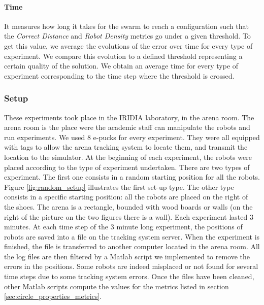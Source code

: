 \documentclass[oneside, a4paper, 12pt]{memoir}
\begin{document}
					
				\paragraph{Time}

				
				It measures how long it takes for the swarm to reach a configuration such that the \emph{Correct Distance} and \emph{Robot Density} metrics go under a given threshold. To get this value, we average the evolutions of the error over time for every type of experiment. We compare this evolution to a defined threshold representing a certain quality of the solution. We obtain an average time for every type of experiment corresponding to the time step where the threshold is crossed.
				
			\subsubsection{Setup}
			

			
				These experiments took place in the IRIDIA laboratory, in the arena room. The arena room is the place were the academic staff can manipulate the robots and run experiments. We used 8 e-pucks for every experiment. They were all equipped with tags to allow the arena tracking system \citep{stranieri2013iridia} to locate them, and transmit the location to the simulator. At the beginning of each experiment, the robots were placed according to the type of experiment undertaken. There are two types of experiment. The first one consists in a random starting position for all the robots. Figure \ref{fig:random_setup} illustrates the first set-up type. The other type consists in a specific starting position: all the robots are placed on the right of the shoes. The arena is a rectangle, bounded with wood boards or walls (on the right of the picture on the two figures there is a wall). Each experiment lasted 3 minutes. At each time step of the 3 minute long experiment, the positions of robots are saved into a file on the tracking system server. When the experiment is finished, the file is transferred to another computer located in the arena room. All the log files are then filtered by a Matlab script we implemented to remove the errors in the positions. Some robots are indeed misplaced or not found for several time steps due to some tracking system errors. Once the files have been cleaned, other Matlab scripts compute the values for the metrics listed in section \ref{sec:circle_properties_metrics}.
			
\end{document}

